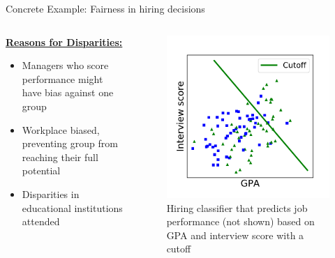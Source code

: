 \begin{frame}{Concrete Example: Fairness in hiring decisions \cite{barocas-hardt-narayanan}}
    \begin{columns}
\begin{column}{0.5\textwidth}
\underline{\textbf{Reasons for Disparities:}}\newline 

   \begin{itemize}
       \item Managers who score performance might have bias against one group
       \item Workplace biased, preventing group from reaching their full potential
       \item Disparities in educational institutions attended
   \end{itemize}
\end{column}
\begin{column}{0.5\textwidth}  %
    \begin{figure}
        \centering
        \includegraphics[width=.70\textwidth]{presentation/assets/toy_example.pdf}
        \caption{Hiring classifier that predicts job performance (not shown) based on GPA and interview score with a cutoff \cite{barocas-hardt-narayanan}}
        \label{fig:example2}
    \end{figure}
\end{column}
\end{columns}
\end{frame}


